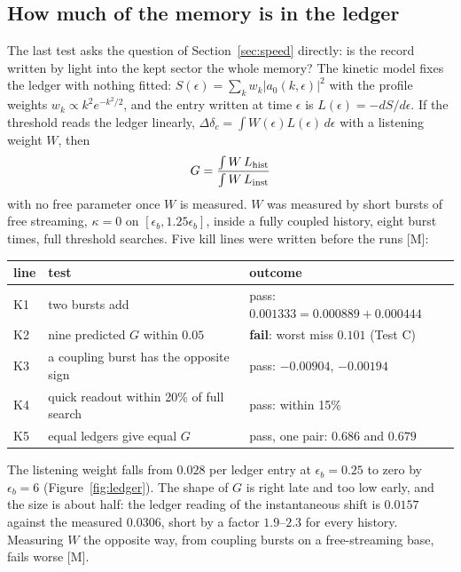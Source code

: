 \documentclass[11pt]{article}
\theoremstyle{definition}
\newcommand{\grade}[1]{\textsf{\small[#1]}}
\begin{document}
\subsection{How much of the memory is in the ledger}

The last test asks the question of Section~\ref{sec:speed} directly: is the record written by light into the kept sector the whole memory? The kinetic model fixes the ledger with nothing fitted: $S(\epsilon)=\sum_kw_k|a_0(k,\epsilon)|^2$ with the profile weights $w_k\propto k^2e^{-k^2/2}$, and the entry written at time $\epsilon$ is $L(\epsilon)=-dS/d\epsilon$. If the threshold reads the ledger linearly, $\Delta\delta_c=\int W(\epsilon)L(\epsilon)\,d\epsilon$ with a listening weight $W$, then
\begin{equation}
G=\frac{\int W\,L_{\rm hist}}{\int W\,L_{\rm inst}}
\end{equation}
with no free parameter once $W$ is measured. $W$ was measured by short bursts of free streaming, $\kappa=0$ on $[\epsilon_b,1.25\epsilon_b]$, inside a fully coupled history, eight burst times, full threshold searches. Five kill lines were written before the runs \grade{M}:

\begin{center}\begin{tabular}{lll}\toprule
line & test & outcome\\\midrule
K1 & two bursts add & pass: $0.001333=0.000889+0.000444$\\
K2 & nine predicted $G$ within $0.05$ & \textbf{fail}: worst miss $0.101$ (Test C)\\
K3 & a coupling burst has the opposite sign & pass: $-0.00904$, $-0.00194$\\
K4 & quick readout within 20\% of full search & pass: within 15\%\\
K5 & equal ledgers give equal $G$ & pass, one pair: $0.686$ and $0.679$\\\bottomrule
\end{tabular}\end{center}

The listening weight falls from $0.028$ per ledger entry at $\epsilon_b=0.25$ to zero by $\epsilon_b=6$ (Figure~\ref{fig:ledger}). The shape of $G$ is right late and too low early, and the size is about half: the ledger reading of the instantaneous shift is $0.0157$ against the measured $0.0306$, short by a factor $1.9$--$2.3$ for every history. Measuring $W$ the opposite way, from coupling bursts on a free-streaming base, fails worse \grade{M}.
\end{document}
